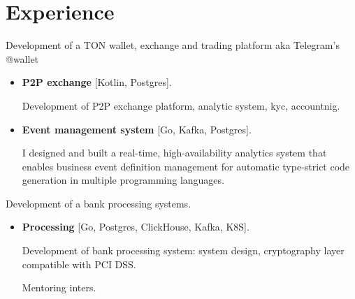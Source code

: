 \documentclass{cv}
\begin{document}
\section{Experience}

\begin{cvblock}{
		}

	Development of a TON wallet, exchange and trading platform aka Telegram's @wallet

	\begin{itemize}
		\item \textbf{P2P exchange} [Kotlin, Postgres].

		      Development of P2P exchange platform, analytic system, kyc, accountnig.

		\item \textbf{Event management system} [Go, Kafka, Postgres].

		      I designed and built a real-time, high-availability analytics system that enables
		      business event definition management for automatic type-strict code generation
		      in multiple programming languages.

	\end{itemize}
\end{cvblock}

\begin{cvblock}{%
		}

	Development of a bank processing systems.

	\begin{itemize}
		\item \textbf{Processing} [Go, Postgres, ClickHouse, Kafka, K8S].

		      Development of bank processing system: system design,
		      cryptography layer compatible with PCI DSS.

		      Mentoring inters.

	\end{itemize}
\end{cvblock}
\end{document}
